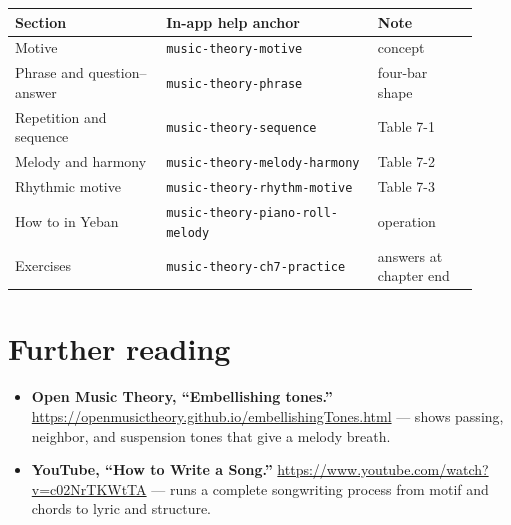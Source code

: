 \begin{center}
\small
\begin{tabular}{p{0.30\linewidth}p{0.42\linewidth}p{0.20\linewidth}}
\toprule
Section & In-app help anchor & Note \\
\midrule
Motive & \texttt{music-theory-motive} & concept \\
Phrase and question--answer & \texttt{music-theory-phrase} & four-bar shape \\
Repetition and sequence & \texttt{music-theory-sequence} & Table 7-1 \\
Melody and harmony & \texttt{music-theory-melody-harmony} & Table 7-2 \\
Rhythmic motive & \texttt{music-theory-rhythm-motive} & Table 7-3 \\
How to in Yeban & \texttt{music-theory-piano-roll-melody} & operation \\
Exercises & \texttt{music-theory-ch7-practice} & answers at chapter end \\
\bottomrule
\end{tabular}
\end{center}

\section*{Further reading}
\begin{itemize}
  \item \textbf{Open Music Theory, “Embellishing tones.”} \url{https://openmusictheory.github.io/embellishingTones.html} — shows passing, neighbor, and suspension tones that give a melody breath.
  \item \textbf{YouTube, “How to Write a Song.”} \url{https://www.youtube.com/watch?v=c02NrTKWtTA} — runs a complete songwriting process from motif and chords to lyric and structure.
\end{itemize}

